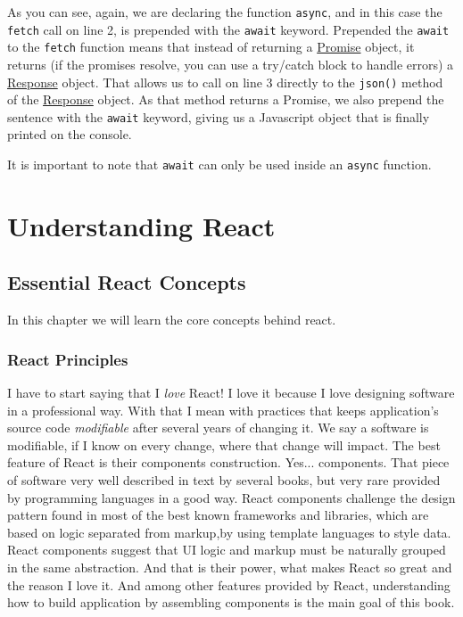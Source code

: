 \documentclass[a4paper, oneside, titlepage, 12pt]{book}
\begin{document}
As you can see, again, we are declaring the function \texttt{async}, and in  this case the \texttt{fetch} call on line 2, is prepended with the \texttt{await} keyword. Prepended the \texttt{await} to the \texttt{fetch} function means that instead of returning a \href{https://developer.mozilla.org/en-US/docs/Web/JavaScript/Reference/Global_Objects/Promise}{Promise} object, it returns (if the promises resolve, you can use a try/catch block to handle errors) a \href{https://developer.mozilla.org/en-US/docs/Web/API/Response}{Response} object. That allows us to call on line 3 directly to the \texttt{json()} method of the \href{https://developer.mozilla.org/en-US/docs/Web/API/Response}{Response} object. As that method returns a Promise, we also prepend the sentence with the \texttt{await} keyword, giving us a Javascript object that is finally printed on the console.
\newline

It is important to note that \texttt{await} can only be used inside an \texttt{async} function.

\part{Understanding React}

\chapter{Essential React Concepts}

In this chapter we will learn the core concepts behind react.  

\section{React Principles} \label{react_mindset}


I have to start saying that I \textit{love} React! I love it because I love designing software in a professional way. With that I mean with practices that keeps application's source code \textit{modifiable} after several years of changing it. We say a software is modifiable, if I know on every change, where that change will impact. The best feature of React is their components construction. Yes... components. That piece of software very well described in text by several books, but very rare provided by programming languages in a good way. React components challenge the design pattern found in most of the best known frameworks and libraries, which are based on logic separated from markup,by using template languages to style data. React components suggest that UI logic and markup must be naturally grouped in the same abstraction. And that is their power, what makes React so great and the reason I love it. And among other features provided by React, understanding how to build application by assembling components is the main goal of this book. 
\newline
\end{document}
